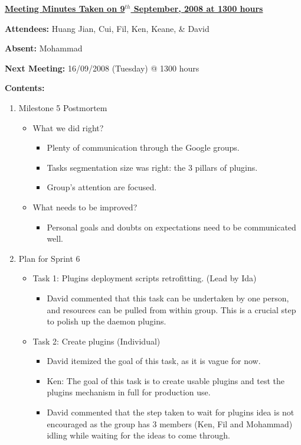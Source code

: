 \documentclass{letter}
\begin{document}
{\large \textbf{\underline{Meeting Minutes Taken on 9$^{th}$ September, 2008 at 1300 hours}}}

\textbf{Attendees:} Huang Jian, Cui, Fil, Ken, Keane, \& David

\textbf{Absent:} Mohammad

\textbf{Next Meeting:} 16/09/2008 (Tuesday) @ 1300 hours 

\textbf{Contents:}

\begin{enumerate}
	\item Milestone 5 Postmortem
		\begin{itemize}
			\item What we did right?
				\begin{itemize}
					\item Plenty of communication through the Google groups.
					\item Tasks segmentation size was right: the 3 pillars of plugins.
					\item Group's attention are focused. 
				\end{itemize}
			\item What needs to be improved?
				\begin{itemize}
					\item Personal goals and doubts on expectations need to be communicated well.
				\end{itemize}
		\end{itemize}
	\item Plan for Sprint 6
		\begin{itemize}
			\item Task 1: Plugins deployment scripts retrofitting. (Lead by Ida)
				\begin{itemize}
					\item David commented that this task can be undertaken by one person, and resources can be pulled from within group. This is a crucial step to polish up the daemon plugins. 
				\end{itemize}
			\item Task 2: Create plugins (Individual)
				\begin{itemize}
					\item David itemized the goal of this task, as it is vague for now. 
					\item Ken: The goal of this task is to create usable plugins and test the plugins mechanism in full for production use. 
					\item David commented that the step taken to wait for plugins idea is not encouraged as the group has 3 members (Ken, Fil and Mohammad) idling while waiting for the ideas to come through. 

\end{itemize}
\end{itemize}
\end{enumerate}
\end{document}
